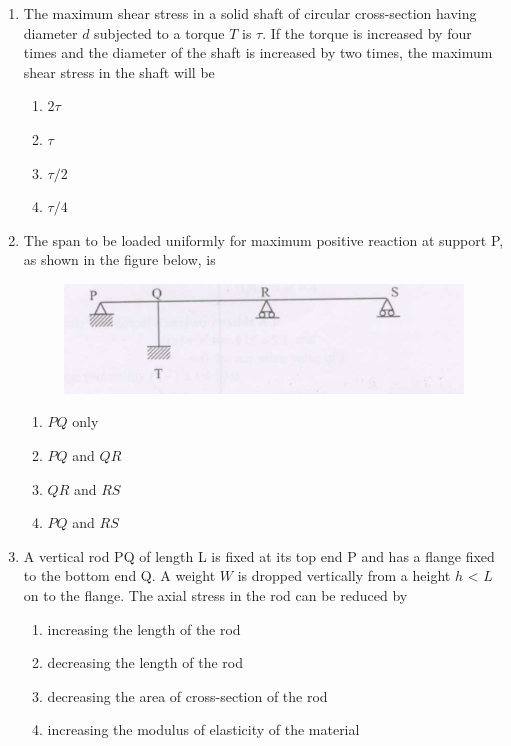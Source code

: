 \documentclass[journal]{IEEEtran}
\begin{document}
\begin{enumerate}
\item The maximum shear stress in a solid shaft of circular cross-section having diameter $d$ subjected to a torque $T$ is $\tau$. If the torque is increased by four times and the diameter of the shaft is increased by two times, the maximum shear stress in the shaft will be  \textbf{}
\begin{multicols}{2}
\begin{enumerate}
\item $2\tau$
\item $\tau$
\item $\tau /2$
\item $\tau /4$
\end{enumerate}
\end{multicols}

\item The span to be loaded uniformly for maximum positive  reaction at support P, as shown in the figure below, is \textbf{}
\begin{figure}[h]
    \centering
    \includegraphics[width=0.8\columnwidth]{figs/fig8.png}
\end{figure}

\vspace{0.1cm}

\begin{multicols}{2}
\begin{enumerate}
\item $PQ$ only
\item $PQ$ and $QR$
\item $QR$ and $RS$
\item $PQ$ and $RS$
\end{enumerate}
\end{multicols}

\item A vertical rod PQ of length L is fixed at its top end P and has a flange fixed to the bottom end Q. A weight $W$ is dropped vertically from a height $h$ < $L$ on to the flange. The axial stress in the rod can be reduced by \textbf{}

\begin{enumerate}
\item increasing the length of the rod 
\item decreasing the length of the rod
\item decreasing the area of cross-section of the rod
\item increasing the modulus of elasticity of the material
\end{enumerate}


\end{enumerate}
\end{document}
